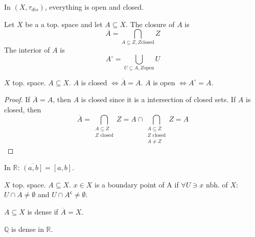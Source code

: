 \begin{example}
  In \( (X, \tau_{dis}) \), everything is open and closed.
\end{example}

\begin{definition}
   Let \( X \) be a a top. space and let \( A \subseteq X \).
   The closure of \( A \) is 
   \[
     \overline{A} = \bigcap_{A \subseteq Z, Z \text{closed}} Z
   \]
    The interior of \( A \) is
    \[
      A^\circ =  \bigcup_{U \subseteq A, Z \text{open}} U
    \]
\end{definition}

\begin{proposition}
   \( X \) top. space. \( A \subseteq X \).
   \( A \) is closed \( \iff \overline{A} = A \).
   \( A \) is open \( \iff A^\circ = A \).
\end{proposition}

\begin{proof}
  If \( \overline{A} = A \), then \( A \) is closed since it is a intersection of closed sets.
  If \( A \) is closed, then
  \[
    \overline{A} = \bigcap_{\substack{A \subseteq Z \\ Z \text{ closed}}} Z
    = A \cap \bigcap_{\substack{A \subseteq Z \\ Z \text{ closed} \\ A \neq Z}} Z = A
  \]
\end{proof}

\begin{example}
  In \( \mathbb{R} \): \( \overline{\left(a, b\right]} = [a, b] \).
\end{example}

\begin{definition}
   \( X \) top. space. \( A \subseteq X \).
   \( x \in X \) is a boundary point of A if
   \( \forall U \ni x \) nbh. of \( X \): 
   \( U \cap A \neq \emptyset \) and 
   \( U \cap A^\mathsf{c} \neq \emptyset \).
\end{definition}

\begin{definition}[Dense]
  \( A \subseteq X \) is dense if \( \overline{A} = X \).
\end{definition}

\begin{example}
    \( \mathbb{Q} \) is dense in \( \mathbb{R} \).
\end{example}

